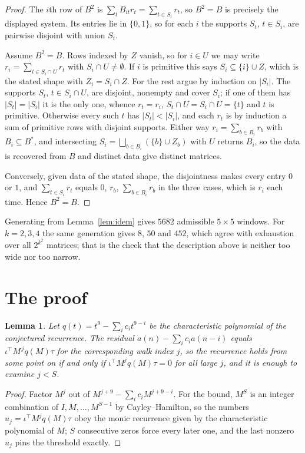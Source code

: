 \documentclass[11pt,a4paper]{article}
\theoremstyle{plain}
\newtheorem{lemma}[theorem]{Lemma}
\theoremstyle{definition}
\begin{document}
\begin{proof}
The $i$th row of $B^2$ is $\sum_t B_{it}r_t=\sum_{t\in S_i}r_t$, so $B^2=B$ is precisely the
displayed system. Its entries lie in $\{0,1\}$, so for each $i$ the supports $S_t$,
$t\in S_i$, are pairwise disjoint with union $S_i$.

Assume $B^2=B$. Rows indexed by $Z$ vanish, so for $i\in U$ we may write
$r_i=\sum_{t\in S_i\cap U}r_t$ with $S_i\cap U\neq\emptyset$. If $i$ is primitive this says
$S_i\subseteq\{i\}\cup Z$, which is the stated shape with $Z_i=S_i\cap Z$. For the rest argue
by induction on $|S_i|$. The supports $S_t$, $t\in S_i\cap U$, are disjoint, nonempty and
cover $S_i$; if one of them has $|S_t|=|S_i|$ it is the only one, whence $r_t=r_i$,
$S_t\cap U=S_i\cap U=\{t\}$ and $t$ is primitive. Otherwise every such $t$ has
$|S_t|<|S_i|$, and each $r_t$ is by induction a sum of primitive rows with disjoint supports.
Either way $r_i=\sum_{b\in B_i}r_b$ with $B_i\subseteq B^{\ast}$, and intersecting
$S_i=\bigsqcup_{b\in B_i}(\{b\}\cup Z_b)$ with $U$ returns $B_i$, so the data is recovered
from $B$ and distinct data give distinct matrices.

Conversely, given data of the stated shape, the disjointness makes every entry $0$ or $1$, and
$\sum_{t\in S_i}r_t$ equals $0$, $r_b$, $\sum_{b\in B_i}r_b$ in the three cases, which is
$r_i$ each time. Hence $B^2=B$.
\end{proof}

Generating from Lemma~\ref{lem:idem} gives $5682$ admissible $5\times5$ windows. For
$k=2,3,4$ the same generation gives $8$, $50$ and $452$, which agree with exhaustion over all
$2^{k^2}$ matrices; that is the check that the description above is neither too wide nor too
narrow.

\section{The proof}

\begin{lemma}\label{lem:crit}
Let $q(t)=t^{9}-\sum_i c_it^{9-i}$ be the characteristic polynomial of the
conjectured recurrence. The residual $a(n)-\sum_ic_ia(n-i)$ equals
$\iota^{\!\top}M^{\,j}q(M)\tau$ for the corresponding walk index $j$, so the recurrence
holds from some point on if and only if $\iota^{\!\top}M^{j}q(M)\tau=0$ for all large $j$,
and it is enough to examine $j<S$.
\end{lemma}

\begin{proof}
Factor $M^{j}$ out of $M^{j+9}-\sum_ic_iM^{j+9-i}$. For the bound, $M^{S}$
is an integer combination of $I,M,\dots,M^{S-1}$ by Cayley--Hamilton, so the numbers
$u_j=\iota^{\!\top}M^{j}q(M)\tau$ obey the monic recurrence given by the characteristic
polynomial of $M$; $S$ consecutive zeros force every later one, and the last nonzero $u_j$
pins the threshold exactly.
\end{proof}
\end{document}

